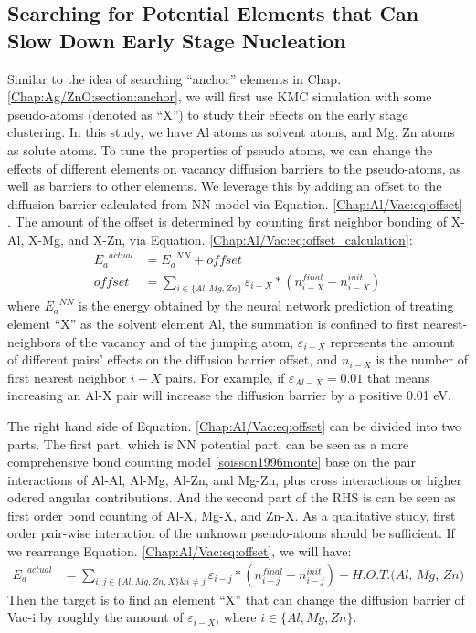 \subsection{Searching for Potential Elements that Can Slow Down Early Stage Nucleation}
Similar to the idea of searching ``anchor'' elements in Chap. \ref{Chap:Ag/ZnO:section:anchor}, we will first use \ac{KMC} simulation with some pseudo-atoms (denoted as ``X'') to study their effects on the early stage clustering. In this study, we have Al atoms as solvent atoms, and Mg, Zn atoms as solute atoms. To tune the properties of pseudo atoms, we can change the effects of different elements on vacancy diffusion barriers to the pseudo-atoms, as well as barriers to other elements. We leverage this by adding an offset to the diffusion barrier calculated from \ac{NN} model via Equation. \ref{Chap:Al/Vac:eq:offset} . The amount of the offset is determined by counting first neighbor bonding of X-Al, X-Mg, and X-Zn, via Equation. \ref{Chap:Al/Vac:eq:offset_calculation}:
\begin{subequations}
\begin{align}
{E_a}^{actual} & = {E_a}^{NN} + \textit{offset} \label{Chap:Al/Vac:eq:offset} \\
\textit{offset} & = \sum_{i\in\{Al, Mg, Zn\}} \varepsilon_{i-X} * ( n_{i-X}^{final} - n_{i-X}^{init}) \label{Chap:Al/Vac:eq:offset_calculation}
\end{align}
\end{subequations}
where ${E_a}^{NN}$ is the energy obtained by the neural network prediction of treating element ``X'' as the solvent element Al, the summation is confined to first nearest-neighbors of the vacancy and of the jumping atom, $\varepsilon_{i-X}$ represents the amount of different pairs' effects on the diffusion barrier offset, and $n_{i-X}$ is the number of first nearest neighbor $i-X$ pairs. For example, if $\varepsilon_{Al-X} = 0.01$ that means increasing an Al-X pair will increase the diffusion barrier by a positive 0.01 eV.


The right hand side of Equation. \ref{Chap:Al/Vac:eq:offset} can be divided into two parts. The first part, which is \ac{NN} potential part, can be seen as a more comprehensive bond counting model \ref{soisson1996monte} base on the pair interactions of Al-Al, Al-Mg, Al-Zn, and Mg-Zn, plus cross interactions or higher odered angular contributions. And the second part of the RHS is can be seen as first order bond counting of Al-X, Mg-X, and Zn-X. As a qualitative study, first order pair-wise interaction of the unknown pseudo-atoms should be sufficient. If we rearrange Equation. \ref{Chap:Al/Vac:eq:offset}, we will have:
\begin{subequations}
\begin{align}
{E_a}^{actual} & = \sum_{i, j \in\{Al, Mg, Zn, X\} \& i \neq j} \varepsilon_{i-j} * ( n_{i-j}^{final} - n_{i-j}^{init}) + \textit{H.O.T.(Al, Mg, Zn)} \label{Chap:Al/Vac:eq:rearrange}
\end{align}
\end{subequations}
Then the target is to find an element ``X'' that can change the diffusion barrier of Vac-i by roughly the amount of $\varepsilon_{i-X}$, where $i \in \{Al, Mg, Zn\}$.

